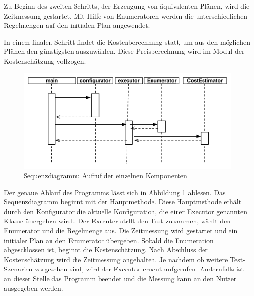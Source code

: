 Zu Beginn des zweiten Schritts, der Erzeugung von äquivalenten Plänen, wird die Zeitmessung gestartet.  Mit Hilfe von Enumeratoren werden die unterschiedlichen Regelmengen auf den initialen Plan angewendet.

In einem finalen Schritt findet die Kostenberechnung statt, um aus den möglichen Plänen den günstigsten auszuwählen. Diese Preisberechnung wird im Modul der Kostenschätzung vollzogen.



\begin{figure}[ht]
  \centering
  \includegraphics[width=\textwidth]{04_Implementierung/00_media/SequenceDiagramConfiguration.pdf}
  \caption{Sequenzdiagramm: Aufruf der einzelnen Komponenten}
  \label{SequenceDiagramConfiguration}
\end{figure}


Der genaue Ablauf des Programms lässt sich in Abbildung \ref{SequenceDiagramConfiguration} ablesen. Das Sequenzdiagramm beginnt mit der Hauptmethode. Diese Hauptmethode erhält durch den Konfigurator die aktuelle Konfiguration, die einer Executor genannten Klasse  übergeben wird.. Der Executer stellt den Test zusammen, wählt den Enumerator und die Regelmenge aus. Die Zeitmessung wird gestartet und ein initialer Plan an den Enumerator übergeben. Sobald die Enumeration abgeschlossen ist, beginnt die Kostenschätzung. Nach Abschluss der Kostenschätzung wird die Zeitmessung angehalten. Je nachdem ob weitere Test-Szenarien vorgesehen sind, wird der Executor erneut aufgerufen. Andernfalls ist an dieser Stelle das Programm beendet und die Messung kann an den Nutzer ausgegeben werden.
